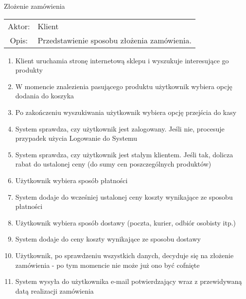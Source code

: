 \item Złożenie zamówienia \\ 
  \begin{tabularx}{\linewidth}{ c X }
  Aktor: & Klient \\
  Opis: & Przedstawienie sposobu złożenia zamówienia.\\
  \end{tabularx}
  \begin{enumerate}
    \item Klient uruchamia stronę internetową sklepu i wyszukuje interesujące go
    produkty
    \item W momencie znalezienia pasującego produktu użytkownik wybiera opcję
    dodania do koszyka
    \item Po zakończeniu wyszukiwania użytkownik wybiera opcję przejścia do kasy
    \item System sprawdza, czy użytkownik jest zalogowany. Jeśli nie, procesuje
    przypadek użycia Logowanie do Systemu
    \item System sprawdza, czy użytkownik jest stałym klientem. Jeśli tak,
    dolicza rabat do ustalonej ceny (do sumy cen poszczególnych produktów)
    \item Użytkownik wybiera sposób płatności
    \item System dodaje do wcześniej ustalonej ceny koszty wynikające ze sposobu
    płatności
    \item Użytkownik wybiera sposób dostawy (poczta, kurier, odbiór osobisty
    itp.)
    \item System dodaje do ceny koszty wynikające ze sposobu dostawy
    \item Użytkownik, po sprawdzeniu wszystkich danych, decyduje się na złożenie
    zamówienia - po tym momencie nie może już ono być cofnięte
    \item System wysyła do użytkownika e-mail potwierdzający wraz z przewidywaną
    datą realizacji zamówienia
  \end{enumerate} 